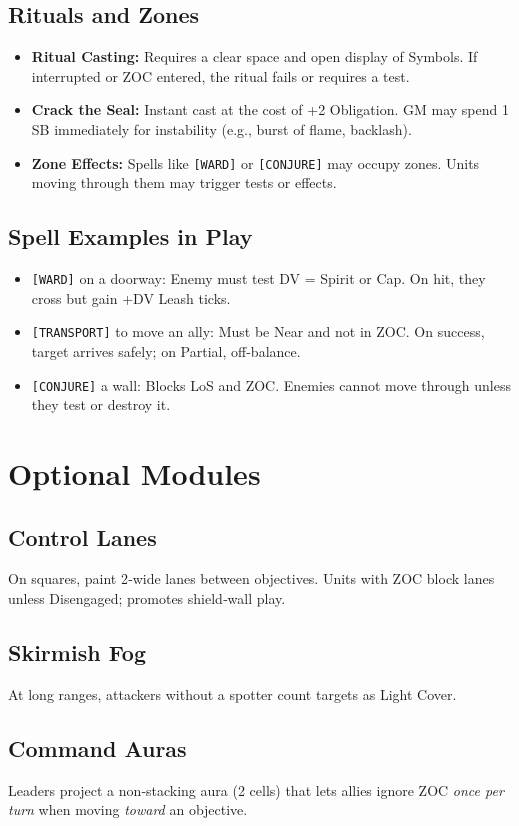 \documentclass[11pt]{article}
\newcommand{\Tag}[1]{\texttt{[#1]}}
\begin{document}
\subsection{Rituals and Zones}
\begin{itemize}
  \item \textbf{Ritual Casting:} Requires a clear space and open display of Symbols. If interrupted or ZOC entered, the ritual fails or requires a test.
  \item \textbf{Crack the Seal:} Instant cast at the cost of +2 Obligation. GM may spend 1 SB immediately for instability (e.g., burst of flame, backlash).
  \item \textbf{Zone Effects:} Spells like \Tag{WARD} or \Tag{CONJURE} may occupy zones. Units moving through them may trigger tests or effects.
\end{itemize}

\subsection{Spell Examples in Play}
\begin{itemize}
  \item \Tag{WARD} on a doorway: Enemy must test DV = Spirit or Cap. On hit, they cross but gain +DV Leash ticks.
  \item \Tag{TRANSPORT} to move an ally: Must be Near and not in ZOC. On success, target arrives safely; on Partial, off-balance.
  \item \Tag{CONJURE} a wall: Blocks LoS and ZOC. Enemies cannot move through unless they test or destroy it.
\end{itemize}

\section{Optional Modules}
\subsection*{Control Lanes}
On squares, paint 2‑wide lanes between objectives. Units with ZOC block lanes unless Disengaged; promotes shield‑wall play.

\subsection*{Skirmish Fog}
At long ranges, attackers without a spotter count targets as Light Cover.

\subsection*{Command Auras}
Leaders project a non‑stacking aura (2 cells) that lets allies ignore ZOC \emph{once per turn} when moving \emph{toward} an objective.
\end{document}
